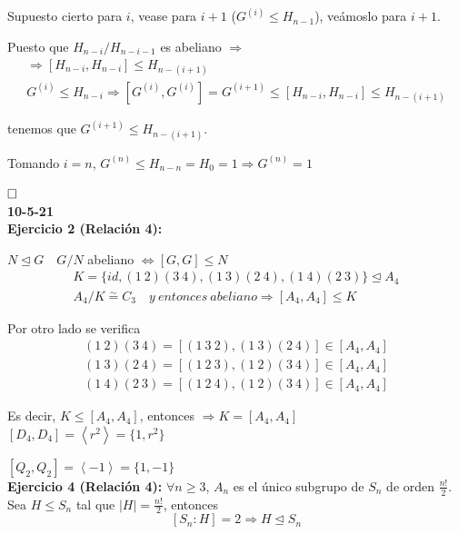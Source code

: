 \documentclass{article}
\begin{document}
Supuesto cierto para $i$, vease para $i+1$ ($G^{(i)}\leq H_{n-1}$), veámoslo para $i+1$.

Puesto que $H_{n-i}/H_{n-i-1}$ es abeliano $\Rightarrow$
\begin{gather*}
\Rightarrow [H_{n-i},H_{n-i}]\leq H_{n-(i+1)} \\
G^{(i)}\leq H_{n-i}\Rightarrow [G^{(i)},G^{(i)}]=G^{(i+1)}\leq [H_{n-i},H_{n-i}]\leq H_{n-(i+1)}
\end{gather*}

tenemos que $G^{(i+1)}\leq H_{n-(i+1)}$. 

Tomando $i=n$, $G^{(n)}\leq H_{n-n}=H_0=1\Rightarrow G^{(n)}=1$

$\hfill\square$ \\

\textbf{10-5-21} \\

\textbf{Ejercicio 2 (Relación 4):} 

$N\unlhd G\quad G/N$ abeliano $\Leftrightarrow \left[G,G\right]\leq N$ 
\begin{gather*}
K=\{id,(1\:2)(3\:4), (1\:3)(2\:4), (1\:4)(2\:3)\}\unlhd A_4 \\
A_4/K\overset{\sim}{=} C_3 \quad y\:entonces\:abeliano \Rightarrow \left[A_4,A_4\right]\leq K
\end{gather*}

Por otro lado se verifica
\begin{gather*}
(1\:2)(3\:4)=\left[(1\:3\:2),(1\:3)(2\:4)\right]\in \left[A_4,A_4\right] \\
(1\:3)(2\:4)=\left[(1\:2\:3),(1\:2)(3\:4)\right]\in \left[A_4,A_4\right] \\
(1\:4)(2\:3)=\left[(1\:2\:4),(1\:2)(3\:4)\right]\in \left[A_4,A_4\right]
\end{gather*}

Es decir, $K\leq \left[A_4,A_4\right]$, entonces $\Rightarrow K=\left[A_4,A_4\right]$ \\

$\left[D_4,D_4\right]=\left\langle r^2\right\rangle =\{1,r^2\}$ 

$\left[Q_2,Q_2\right]=\left\langle -1\right\rangle=\{1,-1\}$ \\

\textbf{Ejercicio 4 (Relación 4):} $\forall n\geq 3$, $A_n$ es el único subgrupo de $S_n$ de orden $\frac{n!}{2}$. Sea $H\leq S_n$ tal que $|H|=\frac{n!}{2}$, entonces
\begin{equation*}
\left[S_n:H\right]=2\Rightarrow H\unlhd S_n
\end{equation*}
\end{document}
